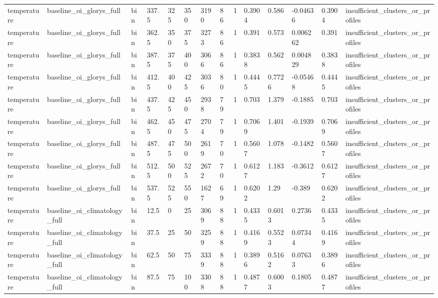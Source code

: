 \begin{table}[htbp]
\begin{tabular}{llllllllllllll}
temperature & baseline\_oi\_glorys\_full & bin & 337.5 & 325 & 350 & 3190 & 86 & 1 & 0.3904 & 0.586 & -0.04636 & 0.3904 & insufficient\_clusters\_or\_profiles \\
temperature & baseline\_oi\_glorys\_full & bin & 362.5 & 350 & 375 & 3273 & 86 & 1 & 0.391 & 0.573 & 0.006262 & 0.391 & insufficient\_clusters\_or\_profiles \\
temperature & baseline\_oi\_glorys\_full & bin & 387.5 & 375 & 400 & 3066 & 86 & 1 & 0.3838 & 0.562 & 0.004829 & 0.3838 & insufficient\_clusters\_or\_profiles \\
temperature & baseline\_oi\_glorys\_full & bin & 412.5 & 400 & 425 & 3036 & 80 & 1 & 0.4445 & 0.7726 & -0.05468 & 0.4445 & insufficient\_clusters\_or\_profiles \\
temperature & baseline\_oi\_glorys\_full & bin & 437.5 & 425 & 450 & 2938 & 79 & 1 & 0.703 & 1.379 & -0.1885 & 0.703 & insufficient\_clusters\_or\_profiles \\
temperature & baseline\_oi\_glorys\_full & bin & 462.5 & 450 & 475 & 2704 & 79 & 1 & 0.7069 & 1.401 & -0.1939 & 0.7069 & insufficient\_clusters\_or\_profiles \\
temperature & baseline\_oi\_glorys\_full & bin & 487.5 & 475 & 500 & 2619 & 70 & 1 & 0.5607 & 1.078 & -0.1482 & 0.5607 & insufficient\_clusters\_or\_profiles \\
temperature & baseline\_oi\_glorys\_full & bin & 512.5 & 500 & 525 & 2672 & 70 & 1 & 0.6127 & 1.183 & -0.3612 & 0.6127 & insufficient\_clusters\_or\_profiles \\
temperature & baseline\_oi\_glorys\_full & bin & 537.5 & 525 & 550 & 1627 & 69 & 1 & 0.6202 & 1.29 & -0.389 & 0.6202 & insufficient\_clusters\_or\_profiles \\
temperature & baseline\_oi\_climatology\_full & bin & 12.5 & 0 & 25 & 3069 & 88 & 1 & 0.4335 & 0.6013 & 0.2736 & 0.4335 & insufficient\_clusters\_or\_profiles \\
temperature & baseline\_oi\_climatology\_full & bin & 37.5 & 25 & 50 & 3259 & 88 & 1 & 0.4169 & 0.5523 & 0.07344 & 0.4169 & insufficient\_clusters\_or\_profiles \\
temperature & baseline\_oi\_climatology\_full & bin & 62.5 & 50 & 75 & 3339 & 88 & 1 & 0.3896 & 0.5162 & 0.07633 & 0.3896 & insufficient\_clusters\_or\_profiles \\
temperature & baseline\_oi\_climatology\_full & bin & 87.5 & 75 & 100 & 3308 & 88 & 1 & 0.4877 & 0.6003 & 0.1805 & 0.4877 & insufficient\_clusters\_or\_profiles \\

\end{tabular}
\end{table}
